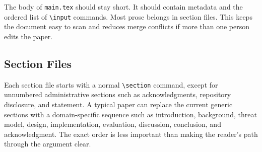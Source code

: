The body of \texttt{main.tex} should stay short. It should contain metadata and the ordered list of \texttt{\textbackslash input} commands. Most prose belongs in section files. This keeps the document easy to scan and reduces merge conflicts if more than one person edits the paper.

\subsection{Section Files}

Each section file starts with a normal \texttt{\textbackslash section} command, except for unnumbered administrative sections such as acknowledgments, repository disclosure, and statement. A typical paper can replace the current generic sections with a domain-specific sequence such as introduction, background, threat model, design, implementation, evaluation, discussion, conclusion, and acknowledgment. The exact order is less important than making the reader's path through the argument clear.
